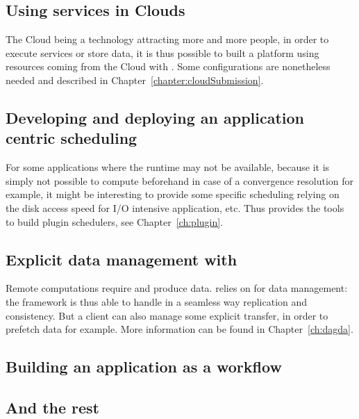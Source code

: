\subsection{Using services in Clouds}
\label{sub:Cloud}

The Cloud being a technology attracting more and more people, in order
to execute services or store data, it is thus possible to built a
platform using resources coming from the Cloud with \diet. Some
configurations are nonetheless needed and described in
Chapter~\ref{chapter:cloudSubmission}.

\subsection{Developing and deploying an application centric scheduling}
\label{sub:scheduling}

For some applications where the runtime may not be available, because
it is simply not possible to compute beforehand in case of a
convergence resolution for example, it might be interesting to provide
some specific scheduling relying on the disk access speed for I/O
intensive application, etc. Thus \diet provides the tools to build
plugin schedulers, see Chapter~\ref{ch:plugin}.

\subsection{Explicit data management with \dagda}
\label{sub:dagda}

Remote computations require and produce data. \diet relies on \dagda
for data management: the framework is thus able to handle in a
seamless way replication and consistency. But a client can also manage
some explicit transfer, in order to prefetch data for example. More
information can be found in Chapter~\ref{ch:dagda}.

\subsection{Building an application as a workflow}
\label{sub:workflow}

\subsection{And the rest}
\label{sub:rest}

